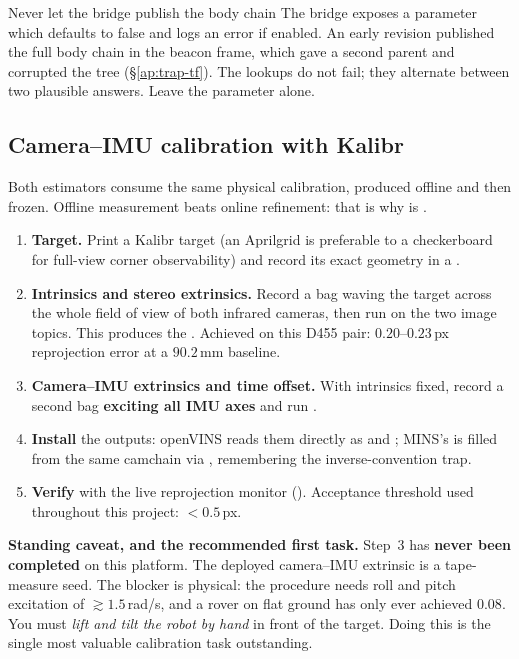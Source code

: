 \begin{trapbox}{Never let the bridge publish the body chain}
The bridge exposes a  parameter
which defaults to false and logs an error if enabled. An early revision
published the full body chain in the beacon frame, which gave
 a second parent and corrupted the tree
(\S\ref{ap:trap-tf}). The lookups do not fail; they alternate between two
plausible answers. Leave the parameter alone.
\end{trapbox}

\subsection{Camera--IMU calibration with Kalibr}
Both estimators consume the same physical calibration, produced offline and
then frozen. Offline measurement beats online refinement: that is why
 is .

\begin{enumerate}[leftmargin=1.4em]
\item \textbf{Target.} Print a Kalibr target (an Aprilgrid is preferable to a
  checkerboard for full-view corner observability) and record its exact
  geometry in a .
\item \textbf{Intrinsics and stereo extrinsics.} Record a bag waving the target
  across the whole field of view of both infrared cameras, then run
   on the two image topics. This produces the
  . Achieved on this D455 pair: $0.20$--$0.23$\,px
  reprojection error at a $90.2$\,mm baseline.
\item \textbf{Camera--IMU extrinsics and time offset.} With intrinsics fixed,
  record a second bag \textbf{exciting all IMU axes} and run
  .
\item \textbf{Install} the outputs: openVINS reads them directly as
   and ; MINS's
   is filled from the same camchain via
  , remembering the inverse-convention trap.
\item \textbf{Verify} with the live reprojection monitor
  (). Acceptance threshold used throughout this
  project: $<0.5$\,px.
\end{enumerate}

\noindent \textbf{Standing caveat, and the recommended first task.} Step~3 has
\textbf{never been completed} on this platform. The deployed camera--IMU
extrinsic is a tape-measure seed. The blocker is physical: the procedure needs
roll and pitch excitation of $\gtrsim1.5$\,rad/s, and a rover on flat ground has
only ever achieved $0.08$. You must \emph{lift and tilt the robot by hand} in
front of the target. Doing this is the single most valuable calibration task
outstanding.

